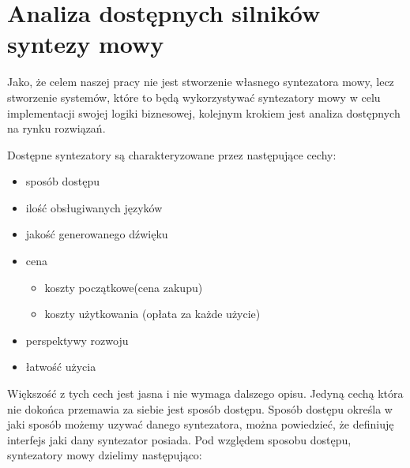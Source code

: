 \section {Analiza dostępnych silników syntezy mowy}

Jako, że celem naszej pracy nie jest stworzenie własnego syntezatora mowy, lecz stworzenie systemów, które to będą wykorzystywać syntezatory mowy w celu implementacji swojej logiki biznesowej, kolejnym krokiem jest analiza dostępnych na rynku rozwiązań. 

Dostępne syntezatory są charakteryzowane przez następujące cechy:
\begin{itemize}
	\item sposób dostępu
	\item ilość obsługiwanych języków
	\item jakość generowanego dźwięku
	\item cena
	\begin{itemize}
		\item koszty początkowe(cena zakupu)
		\item koszty użytkowania (opłata za każde użycie)
	\end{itemize}
	\item perspektywy rozwoju
	\item łatwość użycia
\end{itemize}

Większość z tych cech jest jasna i nie wymaga dalszego opisu. Jedyną cechą która nie dokońca przemawia za siebie jest sposób dostępu. Sposób dostępu określa w jaki sposób możemy uzywać danego syntezatora, można powiedzieć, że definiuję interfejs jaki dany syntezator posiada. Pod względem sposobu dostępu, syntezatory mowy dzielimy następująco:


